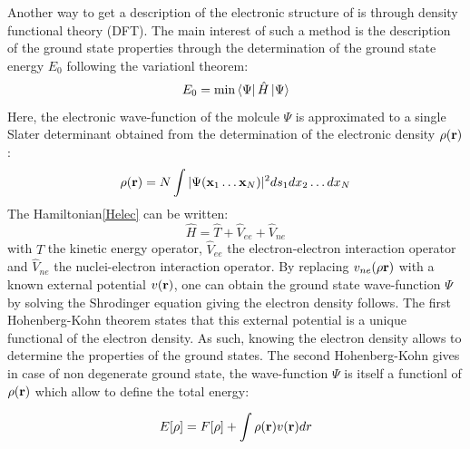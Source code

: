 \documentclass[12pt]{report}
\numberwithin{equation}{section}
\begin{document}
Another way to get a description of the electronic structure of is through density functional theory (DFT).
The main interest of such a method is the description of the ground state properties through the determination of the ground state energy $E_0$ following the variationl theorem:
\begin{equation}
    E_0 = \min \bra{\Psi} \hat{H} \ket{\Psi}
\end{equation}
Here, the electronic wave-function of the molcule $\Psi$ is approximated to a single Slater determinant obtained from the determination of the electronic density $\rho(\vb r)$:
\begin{equation}
    \rho(\vb r)=N\int |\Psi(\vb x_1 \ldots \vb x_N)|^2 ds_1 dx_2 \ldots dx_N
\end{equation}
The Hamiltonian\ref{Helec} can be written:
\begin{equation}\label{Hop}
    \hat{H}=\hat{T} + \hat{V}_{ee} + \hat{V}_{ne}
\end{equation} 
with $\hat{T}$ the kinetic energy operator, $\hat{V}_{ee}$ the electron-electron interaction operator and $\hat{V}_{ne}$ the nuclei-electron interaction operator. 
By replacing $v_{ne}(\rho\vb r)$ with a known external potential $v(\vb r)$, one can obtain the ground state wave-function $\Psi$ by solving the Shrodinger equation giving the electron density follows.
The first Hohenberg-Kohn theorem states that this external potential is a unique functional of the electron density.
As such, knowing the electron density allows to determine the properties of the ground states.
The second Hohenberg-Kohn gives in case of non degenerate ground state, the wave-function $\Psi$ is itself a functionl of $\rho(\vb r)$ which allow to define the total energy:

\begin{equation}\label{EnergyDFT}
    E[\rho]= F[\rho]+ \int \rho(\vb r) v(\vb r)dr
\end{equation}
\end{document}
